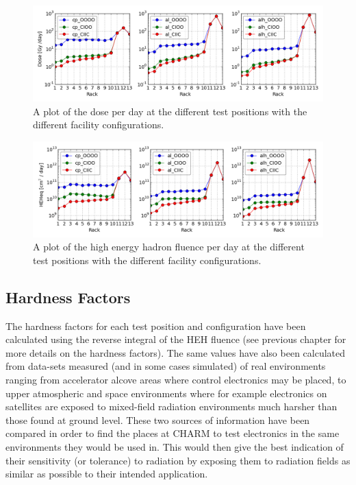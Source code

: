 \clearpage

\begin{figure}[ht!]
	\centering
	\includegraphics[width=\textwidth]{./images/test_positions/dose_per_day}
	\caption{A plot of the dose per day at the different test positions with the different facility configurations.}
	\label{fig:dose_test_pos}
\end{figure}

\begin{figure}[ht!]
	\centering
	\includegraphics[width=\textwidth]{./images/test_positions/heheq_per_day}
	\caption{A plot of the high energy hadron fluence per day at the different test positions with the different facility configurations.}
	\label{fig:dose_test_pos}
\end{figure}

\clearpage

\subsection{Hardness Factors}

The hardness factors for each test position and configuration have been calculated using the reverse integral of the HEH fluence (see previous chapter for more details on the hardness factors). The same values have also been calculated from data-sets measured (and in some cases simulated) of real environments ranging from accelerator alcove areas where control electronics may be placed, to upper atmospheric and space environments where for example electronics on satellites are exposed to mixed-field radiation environments much harsher than those found at ground level. These two sources of information have been compared in order to find the places at CHARM to test electronics in the same environments they would be used in. This would then give the best indication of their sensitivity (or tolerance) to radiation by exposing them to radiation fields as similar as possible to their intended application. \\

